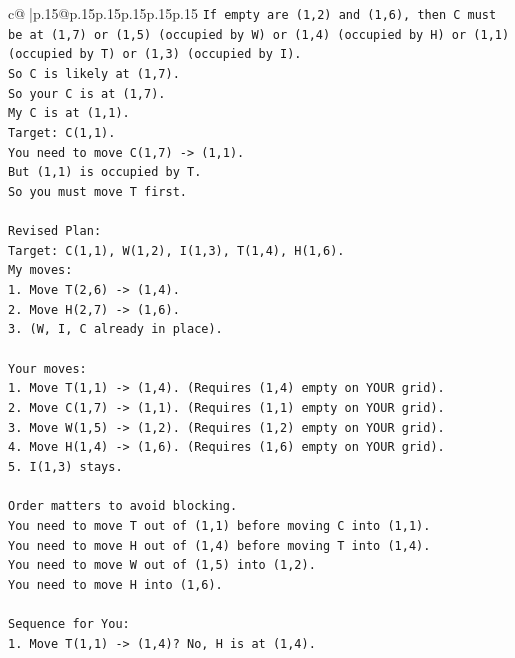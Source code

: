 \documentclass{article}
\begin{document}
{\begin{supertabular}{c@{$\;$}|p{.15\linewidth}@{}p{.15\linewidth}p{.15\linewidth}p{.15\linewidth}p{.15\linewidth}p{.15\linewidth}}
{{{\texttt{If empty are (1,2) and (1,6), then C must be at (1,7) or (1,5) (occupied by W) or (1,4) (occupied by H) or (1,1) (occupied by T) or (1,3) (occupied by I).} \\
\texttt{So C is likely at (1,7).} \\
\texttt{So your C is at (1,7).} \\
\texttt{My C is at (1,1).} \\
\texttt{Target: C(1,1).} \\
\texttt{You need to move C(1,7) {-}> (1,1).} \\
\texttt{But (1,1) is occupied by T.} \\
\texttt{So you must move T first.} \\
\\ 
\texttt{Revised Plan:} \\
\texttt{Target: C(1,1), W(1,2), I(1,3), T(1,4), H(1,6).} \\
\texttt{My moves:} \\
\texttt{1. Move T(2,6) {-}> (1,4).} \\
\texttt{2. Move H(2,7) {-}> (1,6).} \\
\texttt{3. (W, I, C already in place).} \\
\\ 
\texttt{Your moves:} \\
\texttt{1. Move T(1,1) {-}> (1,4). (Requires (1,4) empty on YOUR grid).} \\
\texttt{2. Move C(1,7) {-}> (1,1). (Requires (1,1) empty on YOUR grid).} \\
\texttt{3. Move W(1,5) {-}> (1,2). (Requires (1,2) empty on YOUR grid).} \\
\texttt{4. Move H(1,4) {-}> (1,6). (Requires (1,6) empty on YOUR grid).} \\
\texttt{5. I(1,3) stays.} \\
\\ 
\texttt{Order matters to avoid blocking.} \\
\texttt{You need to move T out of (1,1) before moving C into (1,1).} \\
\texttt{You need to move H out of (1,4) before moving T into (1,4).} \\
\texttt{You need to move W out of (1,5) into (1,2).} \\
\texttt{You need to move H into (1,6).} \\
\\ 
\texttt{Sequence for You:} \\
\texttt{1. Move T(1,1) {-}> (1,4)? No, H is at (1,4).} \\
}}}
\end{supertabular}}
\end{document}
